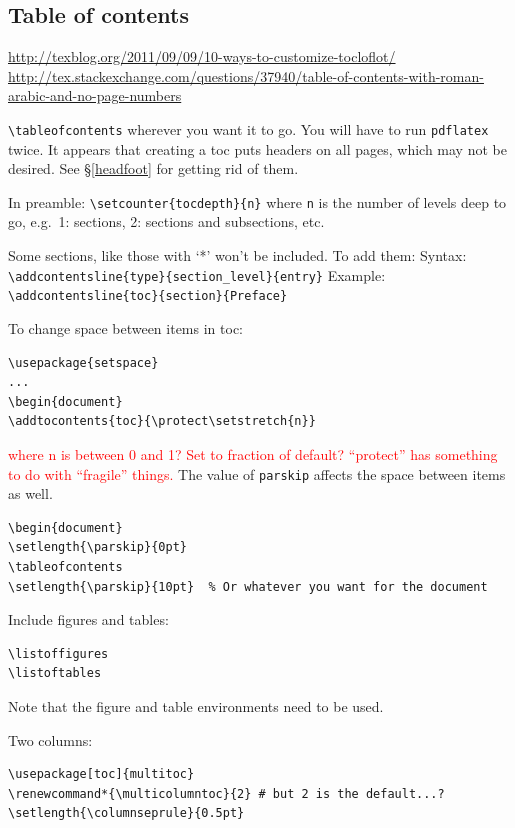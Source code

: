 \documentclass{article}
\begin{document}
\begin{samepage}
\section{Table of contents}
\url{http://texblog.org/2011/09/09/10-ways-to-customize-tocloflot/}
\url{http://tex.stackexchange.com/questions/37940/table-of-contents-with-roman-arabic-and-no-page-numbers}

\verb|\tableofcontents| wherever you want it to go.
You will have to run \texttt{pdflatex} twice.
It appears that creating a toc puts headers on all pages, which may
not be desired. See \S{}\ref{headfoot} for getting rid of them.

In preamble:
\verb|\setcounter{tocdepth}{n}| where \verb|n| is the number of levels deep
to go, e.g.\ 1: sections, 2: sections and subsections, etc.

Some sections, like those with `*' won't be included. To add them:
Syntax: \verb|\addcontentsline{type}{section_level}{entry}|
Example: \verb|\addcontentsline{toc}{section}{Preface}|

To change space between items in toc:
\begin{lstlisting}
\usepackage{setspace}
...
\begin{document}
\addtocontents{toc}{\protect\setstretch{n}}
\end{lstlisting}
\textcolor{red}{where n is between 0 and 1? Set to fraction of default?
``protect'' has something to do with ``fragile'' things.}
The value of \verb|parskip| affects the space between items as well.
\begin{lstlisting}
\begin{document}
\setlength{\parskip}{0pt}
\tableofcontents
\setlength{\parskip}{10pt}  % Or whatever you want for the document
\end{lstlisting}

Include figures and tables:
\begin{lstlisting}
\listoffigures
\listoftables
\end{lstlisting}
Note that the figure and table environments need to be used.

Two columns:
\begin{lstlisting}
\usepackage[toc]{multitoc}
\renewcommand*{\multicolumntoc}{2} # but 2 is the default...?
\setlength{\columnseprule}{0.5pt}
\end{lstlisting}
\end{samepage}

\end{document}
